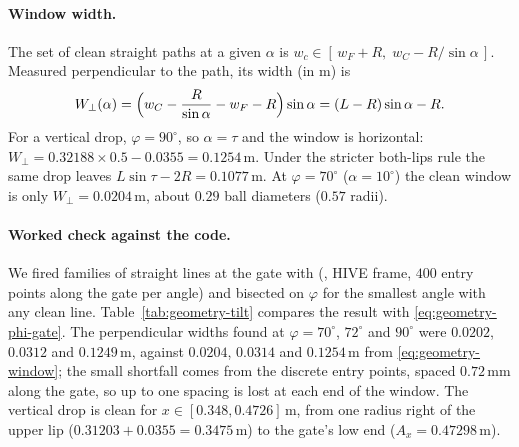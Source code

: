 \paragraph{Window width.} The set of clean straight paths at a given $\alpha$ is
$w_c \in [\,w_F + R,\; w_C - R/\sin\alpha\,]$. Measured perpendicular to the path, its width (in \unit{m}) is
\begin{equation}
  W_\perp(\alpha) = \Bigl(w_C - \frac{R}{\sin\alpha} - w_F - R\Bigr)\sin\alpha = (L - R)\sin\alpha - R .
  \label{eq:geometry-window}
\end{equation}
For a vertical drop, $\varphi = 90^\circ$, so $\alpha = \tau$ and the window is horizontal:
$W_\perp = 0.32188 \times 0.5 - 0.0355 = 0.1254$\,\unit{m}\derived. Under the stricter both-lips
rule the same drop leaves $L\sin\tau - 2R = 0.1077$\,\unit{m}\derived. At $\varphi = 70^\circ$\assumed{}
($\alpha = 10^\circ$) the clean window is only $W_\perp = 0.0204$\,\unit{m}\derived, about $0.29$\derived{}
ball diameters ($0.57$\derived{} radii).

\paragraph{Worked check against the code.} We fired families of straight lines at the gate with
 (, HIVE frame, $400$\assumed{} entry points along the gate per angle)
and bisected on $\varphi$ for the smallest angle with any clean line. Table~\ref{tab:geometry-tilt} compares
the result with \eqref{eq:geometry-phi-gate}. The perpendicular widths found at $\varphi = 70^\circ$,
$72^\circ$ and $90^\circ$ were $0.0202$\predicted, $0.0312$\predicted{} and $0.1249$\,\unit{m}\predicted,
against $0.0204$\derived, $0.0314$\derived{} and $0.1254$\,\unit{m}\derived{} from
\eqref{eq:geometry-window}; the small shortfall comes from the discrete entry points, spaced
$0.72$\,\unit{mm}\derived{} along the gate, so up to one spacing is lost at each end of the window.
The vertical drop is clean for $x \in [0.348, 0.4726]$\,\unit{m}\predicted, from one radius right of
the upper lip ($0.31203 + 0.0355 = 0.3475$\,\unit{m}\derived) to the gate's low end
($A_x = 0.47298$\,\unit{m}\derived).

